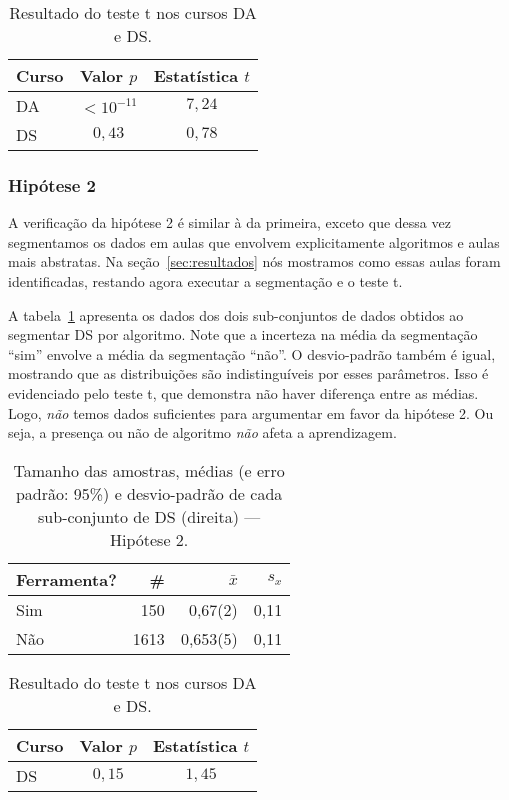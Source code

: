\begin{table}
	\centering
	\caption{Resultado do teste t nos cursos DA e DS.}
	\begin{tabular}{lcc}
	\toprule
	Curso & Valor $p$   & Estatística $t$ \\
	\midrule
	DA    & $<10^{-11}$ & $7,24$ \\
	DS    & $0,43$      & $0,78$ \\ 
	\bottomrule
	\end{tabular}
\end{table}

\subsubsection{Hipótese 2}

A verificação da hipótese 2 é similar à da primeira, exceto que dessa vez segmentamos os dados em aulas que envolvem explicitamente algoritmos e aulas mais abstratas.
Na seção~\ref{sec:resultados} nós mostramos como essas aulas foram identificadas, restando agora executar a segmentação e o teste t.

A tabela~\ref{tab:hipotese2-subsets} apresenta os dados dos dois sub-conjuntos de dados obtidos ao segmentar DS por algoritmo. Note que a incerteza na média da segmentação ``sim'' envolve a média da segmentação ``não''.
O desvio-padrão também é igual, mostrando que as distribuições são indistinguíveis por esses parâmetros.
Isso é evidenciado pelo teste t, que demonstra não haver diferença entre as médias.
Logo, \emph{não} temos dados suficientes para argumentar em favor da hipótese 2.
Ou seja, a presença ou não de algoritmo \emph{não} afeta a aprendizagem.

\begin{table}
	\caption{Tamanho das amostras, médias (e erro padrão: 95\%) e desvio-padrão de cada sub-conjunto de DS (direita) --- Hipótese 2.}
	\label{tab:hipotese2-subsets}
	\begin{tabular}{lrrr}
		\toprule
		Ferramenta? & \# & $\bar{x}$ & $s_x$ \\
		\midrule
		Sim &  150 &  0,67(2) & 0,11 \\
		Não & 1613 & 0,653(5) & 0,11 \\
		\bottomrule
	\end{tabular}
\end{table}

\begin{table}
	\centering
	\caption{Resultado do teste t nos cursos DA e DS.}
	\begin{tabular}{lcc}
	\toprule
	Curso & Valor $p$   & Estatística $t$ \\
	\midrule
	DS    & $0,15$      & $1,45$ \\ 
	\bottomrule
	\end{tabular}
\end{table}

